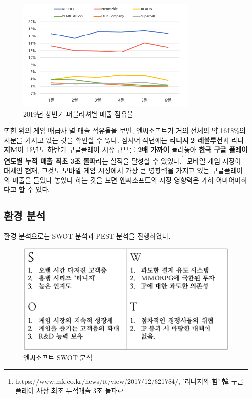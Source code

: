 \documentclass[11pt]{oblivoir}
\begin{document}
		 \begin{figure}[htbp]
		 	\centering
		 	\includegraphics[width=0.8\textwidth]{Pictures/PublisherMaechul.png}
		 	\caption{2019년 상반기 퍼블리셔별 매출 점유율}
		 \end{figure}
	 
	 	또한 위의 게임 배급사 별 매출 점유율을 보면, 엔씨소프트가 거의 전체의 약 16\~18\%의 지분을 가지고 있는 것을 확인할 수 있다. 심지어 작년에는 \textbf{리니지 2 레볼루션}과 
	 	\textbf{리니지M}이 18년도 하반기 구글플레이 시장 규모를 \textbf{2배 가까이} 늘려놓아 \textbf{한국 구글 플레이 연도별 누적 매출 최초 3조 돌파}라는 실적을 달성할 수 있었다.\footnote{https://www.mk.co.kr/news/it/view/2017/12/821784/, ‘리니지의 힘’ 韓 구글 플레이 사상 최초 누적매출 3조 돌파} 모바일 게임 시장이 대세인 현재, 그것도 모바일 게임 시장에서 가장 큰 영향력을 가지고 있는 구글플레이의 매출을 들었다 놓았다 하는 것을 보면 엔씨소프트의 시장 영향력은 가히 어마어마하다고 할 수 있다. 
	 	
		\subsection{환경 분석}
		
		환경 분석으로는 SWOT 분석과 PEST 분석을 진행하였다. 
		
		\begin{figure}[htbp]
			\centering
			\includegraphics[width=1\textwidth]{Pictures/SWOT.png}
			\caption{엔씨소프트 SWOT 분석}
		\end{figure}
\end{document}

